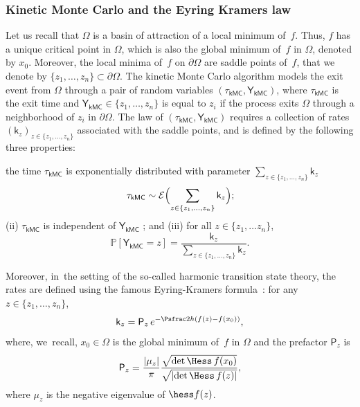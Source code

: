 \subsubsection*{Kinetic Monte Carlo and the Eyring Kramers law}
Let us recall that $\Omega$ is a basin of attraction of a local
minimum of~$f$. Thus, $f$ has a unique critical point
in $\Omega$, which is also the global minimum of~$f$ in $\Omega$,
denoted by $x_0$. Moreover, the local minima of~$f$ on $\partial
\Omega$ are saddle points of~$f$, that we denote by $\{z_1, \ldots, z_n\} \subset \partial \Omega$. The kinetic
Monte Carlo algorithm models the exit event from $\Omega$ through a
pair of random variables $(\tau_{\mathsf {kMC}}, \mathsf Y_{\mathsf
{kMC}})$, where $\tau_{\mathsf{kMC}}$ is the exit time and $\mathsf
Y_{\mathsf {kMC}} \in \{z_1, \ldots, z_n\}$ is equal to $z_i$ if the
process exits $\Omega$ through a neighborhood of $z_i$ in $\partial
\Omega$. The law of $(\tau_{\mathsf {kMC}}, \mathsf Y_{\mathsf
{kMC}})$ requires a collection of rates $(\mathsf k_{z})_{z \in \{z_1,
\ldots, z_n\}}$ associated with
the saddle points, and is defined by the following three properties:
\begin{enumeratei}
\item
the time $ \tau_{\mathsf {kMC}}$ is exponentially distributed
with parameter $\sum_{z \in \{z_1,
\ldots, z_n\}} \mathsf k_{z}$
\begin{equation}\label{eq.k_temps}
\tau_{\mathsf {kMC}} \sim\mathcal E\Bigl(\sum_{z \in \{z_1,
\ldots, z_n\}} \mathsf k_{z}\Bigr);
\end{equation}
(ii) $\tau_{\mathsf {kMC}}$ is independent of $\mathsf Y_{\mathsf
{kMC}}$ ; and (iii) for all $z \in \{z_1, \ldots z_n\}$,
\begin{equation}\label{eq.YY}
\mathbb P[\mathsf Y_{\mathsf {kMC}}=z]= \frac{\mathsf k_{z}}{\sum_{z \in \{z_1,
\ldots, z_n\}} \mathsf k_{z}}.
\end{equation}
\end{enumeratei}
Moreover, in~the setting of the so-called harmonic transition state theory, the
rates are defined using the famous Eyring-Kramers
formula~\cite{hanggi-talkner-barkovec-90,voter-05}: for any $z \in
\{z_1, \ldots,z_n\}$,
\begin{equation}\label{eq.ek}
\mathsf k_{z}=\mathsf P_{z}\, e^{-\Psfrac 2h (f(z)-f(x_0))},
\end{equation}
where, we~recall, $x_0\in \Omega$ is the global minimum of~$f$ in
$\Omega$ and the prefactor $\mathsf P_{z}$ is
\begin{equation}\label{eq.prefactor}
\mathsf P_{z}=\frac{\vert \mu_{z}\vert}{\pi }\frac{ \sqrt{{\det\Hess}\, f (x_0) } }{ \sqrt{\vert {\det \Hess}\, f(z) \vert } },
\end{equation}
where $\mu_{z}$ is the negative eigenvalue of $\hess f(z)$.

